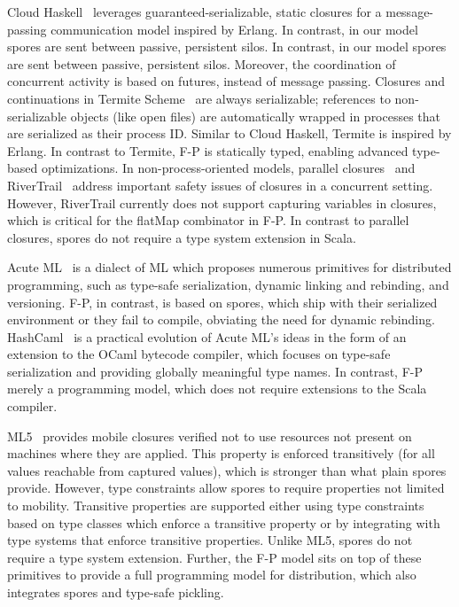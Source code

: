 \documentclass[preprint]{sigplanconf}
\theoremstyle{definition}
\theoremstyle{definition}
\begin{document}
Cloud Haskell~\cite{CloudHaskell} leverages guaranteed-serializable, static
closures for a message-passing communication model inspired by Erlang. In
contrast, in our model spores are sent between passive, persistent silos. In
contrast, in our model spores are sent between passive, persistent silos.
Moreover, the coordination of concurrent activity is based on futures, instead
of message passing. Closures and continuations in Termite
Scheme~\cite{TermiteScheme} are always serializable; references to non-
serializable objects (like open files) are automatically wrapped in processes
that are serialized as their process ID. Similar to Cloud Haskell, Termite is
inspired by Erlang. In contrast to Termite, F-P is statically typed, enabling
advanced type-based optimizations. In non-process-oriented models, parallel
closures~\cite{ParallelClosures} and RiverTrail~\cite{RiverTrail} address
important safety issues of closures in a concurrent setting. However,
RiverTrail currently does not support capturing variables in closures, which
is critical for the flatMap combinator in F-P. In contrast to parallel
closures, spores do not require a type system extension in Scala.

Acute ML~\cite{AcuteML} is a dialect of ML which proposes numerous primitives
for distributed programming, such as type-safe serialization, dynamic linking
and rebinding, and versioning. F-P, in contrast, is based on spores, which
ship with their serialized environment or they fail to compile, obviating the
need for dynamic rebinding. HashCaml~\cite{DistOCaml} is a practical evolution
of Acute ML's ideas in the form of an extension to the OCaml bytecode
compiler, which focuses on type-safe serialization and providing globally
meaningful type names. In contrast, F-P merely a programming model, which does
not require extensions to the Scala compiler.


ML5~\cite{Tom7} provides mobile closures verified not to use resources not
present on machines where they are applied. This property is enforced
transitively (for all values reachable from captured values), which is
stronger than what plain spores provide. However, type constraints allow
spores to require properties not limited to mobility. Transitive properties
are supported either using type constraints based on type classes which
enforce a transitive property or by integrating with type systems that enforce
transitive properties. Unlike ML5, spores do not require a type system
extension. Further, the F-P model sits on top of these primitives to provide a
full programming model for distribution, which also integrates spores and
type-safe pickling.
\end{document}
